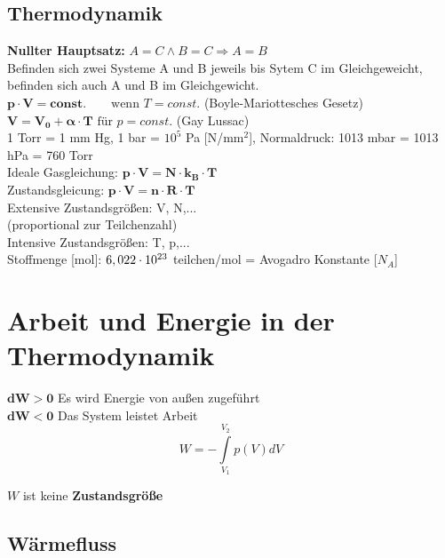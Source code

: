 \subsection{Thermodynamik}

\textbf{Nullter Hauptsatz:} $A=C \wedge B=C \Rightarrow A=B$\\
Befinden sich zwei Systeme A und B jeweils bis Sytem C im Gleichgeweicht, befinden sich auch A und B im Gleichgewicht.\\

$\bm{p \cdot V = const.} \qquad \text{wenn } T=const$. \qquad (Boyle-Mariottesches Gesetz)\\

$\bm{V=V_0+\alpha \cdot T} \text{ für } p=const.$ \qquad (Gay Lussac)\\

1 Torr = 1 mm Hg, 1 bar = $10^5$ Pa [N/mm$^2$], Normaldruck: 1013 mbar = 1013 hPa = 760 Torr\\

Ideale Gasgleichung: $\bm{p\cdot V = N\cdot k_B \cdot T}$\\

Zustandsgleicung: $\bm{p\cdot V = n\cdot R \cdot T}$\\

Extensive Zustandsgrößen: V, N,...\\
(proportional zur Teilchenzahl)\\

Intensive Zustandsgrößen: T, p,...\\

Stoffmenge [mol]: $6,022 \cdot 10^{23}$ teilchen/mol = Avogadro Konstante [$N_A$]\\

\section{Arbeit und Energie in der Thermodynamik}
$\bm{dW>0}$ Es wird Energie von außen zugeführt\\

$\bm{dW<0}$ Das System leistet Arbeit\\

\[W=-\int\limits_{V_1}^{V_2}p(V)dV\]

$W$ ist keine \textbf{Zustandsgröße}

\subsection{Wärmefluss}

